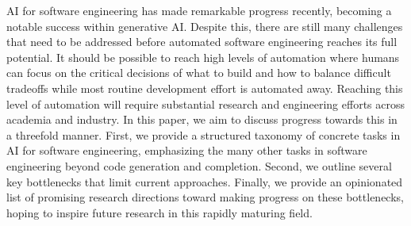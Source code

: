 AI for software engineering has made remarkable progress recently, becoming a notable success within generative AI.
Despite this, there are still many challenges that need to be addressed before automated software engineering reaches its full potential. It should be possible to reach high levels of automation where humans can focus on the critical decisions of what to build and how to balance difficult tradeoffs while most routine development effort is automated away. Reaching this level of automation will require substantial research and engineering efforts across academia and industry. In this paper, we aim to discuss progress towards this in a threefold manner. First, we provide a structured taxonomy of concrete tasks in AI for software engineering, emphasizing the many other tasks in software engineering beyond code generation and completion. Second, we outline several key bottlenecks that limit current approaches. Finally, we provide an opinionated list of promising research directions toward making progress on these bottlenecks, hoping to inspire future research in this rapidly maturing field.
